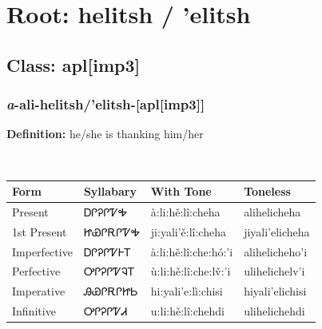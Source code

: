\needspace{4in}
\section*{Root: helitsh / 'elitsh}
\nopagebreak
{}
\needspace{3in}
\subsection*{Class: apl[imp3]}
\nopagebreak
\needspace{2in}
\subsubsection*{\textit{a}{-}ali{-}\textbf{helitsh/'elitsh}{-}[apl[imp3]]}
\nopagebreak
\textbf{Definition: } he/she is thanking him/her
\\[0.5em]
\begin{tabularx}{\textwidth}{l X X X}%
\toprule%
\textbf{Form}&\textbf{Syllabary}&\textbf{With Tone}&\textbf{Toneless}\\%
\midrule%
Present&ᎠᎵᎮᎵᏤᎭ&à:li:hě:lî:cheha&alihelicheha\\%
1st Present&ᏥᏯᎵᎡᎵᏤᎭ&ji:yali’ě:lî:cheha&jiyali’elicheha\\%
Imperfective&ᎠᎵᎮᎵᏤᎰᎢ&à:li:hě:lî:che:hó:’i&alihelicheho’i\\%
Perfective&ᎤᎵᎮᎵᏤᎸᎢ&ù:li:hě:lî:che:lv̌:’i&ulihelichelv’i\\%
Imperative&ᎯᏯᎵᎡᎵᏥᏏ&hi:yali’e:lì:chisi&hiyali’elichisi\\%
Infinitive&ᎤᎵᎮᎵᏤᏗ&u:li:hě:lî:chehdi&ulihelichehdi\\%
\bottomrule%
\end{tabularx}
\\[1em]